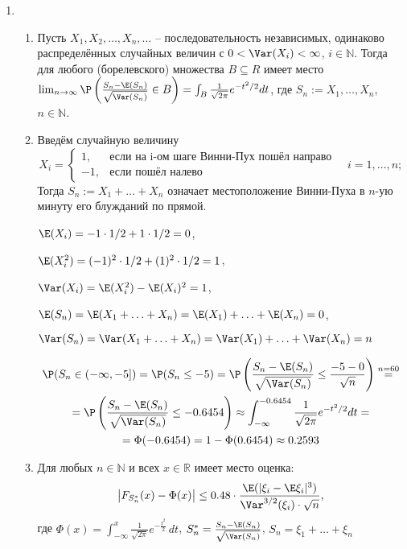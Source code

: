 \begin{enumerate}
\item \begin{enumerate}
\item Пусть $X_1, X_2, \ldots, X_n, \ldots$ – последовательность независимых, одинаково распределённых случайных величин с $0<\Var(X_i)<\infty$, $i \in \mathbb{N}$.  Тогда для любого (борелевского) множества $B \subseteq R$ имеет место $\lim_{n \to \infty} \P\left(\frac{S_n - \E(S_n)}{\sqrt{\Var(S_n)}} \in B\right) = \int_B \frac{1}{\sqrt{2\pi}}e^{-t^2/2} dt$, где $S_n := X_1, \ldots, X_n$, $n \in \mathbb{N}$.
\item Введём случайную величину
\[
X_i = \begin{cases}
1, & \text{если на i-ом шаге Винни-Пух пошёл направо} \\
-1, & \text{если пошёл налево}
\end{cases}
\quad i=1,\ldots, n;
\]
Тогда $S_n := X_1 +\ldots+X_n$ означает местоположение Винни-Пуха в $n$-ую минуту его блужданий по прямой.

$\E(X_i) = -1 \cdot 1/2 + 1 \cdot 1/2 = 0$,

$\E(X_i^2) = (-1)^2 \cdot 1/2 + (1)^2 \cdot 1/2 = 1$,

$\Var(X_i) = \E(X_i^2) - \E(X_i)^2 = 1$,

$\E(S_n) = \E(X_1 + \ldots + X_n ) = \E(X_1) + \ldots + \E(X_n) = 0$,

$\Var(S_n) = \Var(X_1 + \ldots + X_n ) = \Var(X_1) + \ldots + \Var(X_n) = n$

\begin{multline*}
\P(S_n \in (-\infty, -5]) = \P(S_n \leq -5) = \P\left( \frac{S_n-\E(S_n)}{\sqrt{\Var(S_n)}} \leq \frac{-5-0}{\sqrt{n}} \right) \stackrel{n=60}{=} \\
=\P\left( \frac{S_n-\E(S_n)}{\sqrt{\Var(S_n)}} \leq -0.6454\right) \approx \int_{-\infty}^{-0.6454} \frac{1}{\sqrt{2\pi}} e^{-t^2/2} dt = \\
= \Phi(-0.6454) = 1-\Phi(0.6454) \approx0.2593
\end{multline*}
\item Для любых $n \in \mathbb{N}$ и всех $x \in \mathbb{R}$ имеет место оценка:
\[
\bigl|F_{S_n^{*}}(x) - \Phi(x)\bigr| \leq 0.48 \cdot \frac{\E(|\xi_i - \E\xi_i|^3)}{\Var^{3/2}(\xi_i)\cdot\sqrt{n}} \text{,}
\]
где $\Phi(x) = \int_{-\infty}^{x}\frac{1}{\sqrt{2\pi}}e^{-\frac{t^2}{2}}\,dt$, \; $S_n^* = \frac{S_n - \E(S_n)}{\sqrt{\Var(S_n)}}$, \; $S_n = \xi_1 + \ldots + \xi_n$


\end{enumerate}
\end{enumerate}
